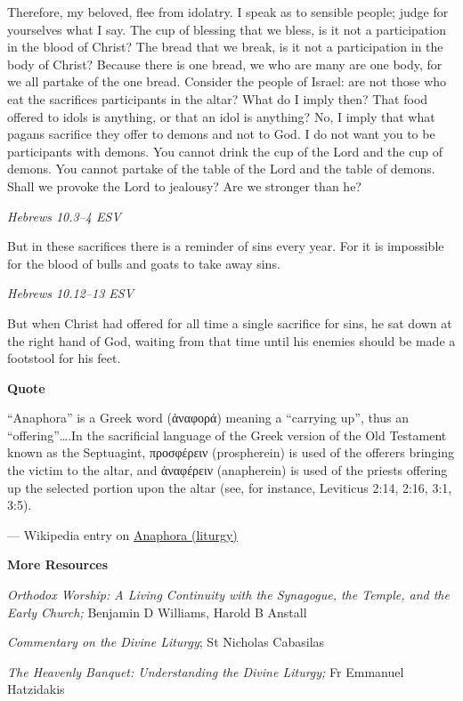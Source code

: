 \documentclass[
]{article}
\begin{document}
Therefore, my beloved, flee from idolatry. I speak as to sensible
people; judge for yourselves what I say. The cup of blessing that we
bless, is it not a participation in the blood of Christ? The bread that
we break, is it not a participation in the body of Christ? Because there
is one bread, we who are many are one body, for we all partake of the
one bread. Consider the people of Israel: are not those who eat the
sacrifices participants in the altar? What do I imply then? That food
offered to idols is anything, or that an idol is anything? No, I imply
that what pagans sacrifice they offer to demons and not to God. I do not
want you to be participants with demons. You cannot drink the cup of the
Lord and the cup of demons. You cannot partake of the table of the Lord
and the table of demons. Shall we provoke the Lord to jealousy? Are we
stronger than he?

\emph{Hebrews 10.3--4 ESV}

But in these sacrifices there is a reminder of sins every year. For it
is impossible for the blood of bulls and goats to take away sins.

\emph{Hebrews 10.12--13 ESV}

But when Christ had offered for all time a single sacrifice for sins, he
sat down at the right hand of God, waiting from that time until his
enemies should be made a footstool for his feet.

\textbf{Quote}

``Anaphora'' is a Greek word (ἀναφορά) meaning a ``carrying up'', thus
an ``offering''\ldots.In the sacrificial language of the Greek version
of the Old Testament known as the Septuagint, προσφέρειν (prospherein)
is used of the offerer\textquotesingle s bringing the victim to the
altar, and ἀναφέρειν (anapherein) is used of the
priest\textquotesingle s offering up the selected portion upon the altar
(see, for instance, Leviticus 2:14, 2:16, 3:1, 3:5).

--- Wikipedia entry on
\href{https://en.wikipedia.org/wiki/Anaphora_(liturgy)}{\ul{Anaphora
(liturgy)}}

\textbf{More Resources}

\emph{Orthodox Worship: A Living Continuity with the Synagogue, the
Temple, and the Early Church;} Benjamin D Williams, Harold B Anstall

\emph{Commentary on the Divine Liturgy}; St Nicholas Cabasilas

\emph{The Heavenly Banquet: Understanding the Divine Liturgy;} Fr
Emmanuel Hatzidakis
\end{document}
